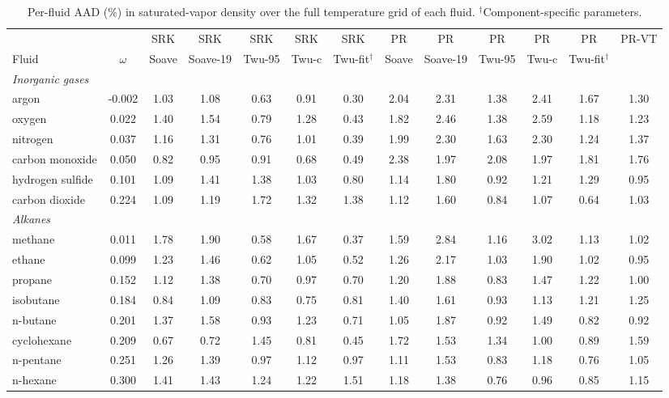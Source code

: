 \begin{table}[H]
\centering
\caption{Per-fluid AAD (\%) in saturated-vapor density over the full temperature grid of each fluid. $^{\dagger}$Component-specific parameters.}
\label{tab:tabS_perfluid_rhov}
\small
\begin{tabular}{lcccccccccccc}
\toprule
 &  & SRK & SRK & SRK & SRK & SRK & PR & PR & PR & PR & PR & PR-VT \\
Fluid & $\omega$ & Soave & Soave-19 & Twu-95 & Twu-c & Twu-fit$^{\dagger}$ & Soave & Soave-19 & Twu-95 & Twu-c & Twu-fit$^{\dagger}$ &  \\
\midrule
\multicolumn{15}{l}{\emph{Inorganic gases}} \\
argon & -0.002 & 1.03 & 1.08 & 0.63 & 0.91 & 0.30 & 2.04 & 2.31 & 1.38 & 2.41 & 1.67 & 1.30 \\
oxygen & 0.022 & 1.40 & 1.54 & 0.79 & 1.28 & 0.43 & 1.82 & 2.46 & 1.38 & 2.59 & 1.18 & 1.23 \\
nitrogen & 0.037 & 1.16 & 1.31 & 0.76 & 1.01 & 0.39 & 1.99 & 2.30 & 1.63 & 2.30 & 1.24 & 1.37 \\
carbon monoxide & 0.050 & 0.82 & 0.95 & 0.91 & 0.68 & 0.49 & 2.38 & 1.97 & 2.08 & 1.97 & 1.81 & 1.76 \\
hydrogen sulfide & 0.101 & 1.09 & 1.41 & 1.38 & 1.03 & 0.80 & 1.14 & 1.80 & 0.92 & 1.21 & 1.29 & 0.95 \\
carbon dioxide & 0.224 & 1.09 & 1.19 & 1.72 & 1.32 & 1.38 & 1.12 & 1.60 & 0.84 & 1.07 & 0.64 & 1.03 \\
\multicolumn{15}{l}{\emph{Alkanes}} \\
methane & 0.011 & 1.78 & 1.90 & 0.58 & 1.67 & 0.37 & 1.59 & 2.84 & 1.16 & 3.02 & 1.13 & 1.02 \\
ethane & 0.099 & 1.23 & 1.46 & 0.62 & 1.05 & 0.52 & 1.26 & 2.17 & 1.03 & 1.90 & 1.02 & 0.95 \\
propane & 0.152 & 1.12 & 1.38 & 0.70 & 0.97 & 0.70 & 1.20 & 1.88 & 0.83 & 1.47 & 1.22 & 1.00 \\
isobutane & 0.184 & 0.84 & 1.09 & 0.83 & 0.75 & 0.81 & 1.40 & 1.61 & 0.93 & 1.13 & 1.21 & 1.25 \\
n-butane & 0.201 & 1.37 & 1.58 & 0.93 & 1.23 & 0.71 & 1.05 & 1.87 & 0.92 & 1.49 & 0.82 & 0.92 \\
cyclohexane & 0.209 & 0.67 & 0.72 & 1.45 & 0.81 & 0.45 & 1.72 & 1.53 & 1.34 & 1.00 & 0.89 & 1.59 \\
n-pentane & 0.251 & 1.26 & 1.39 & 0.97 & 1.12 & 0.97 & 1.11 & 1.53 & 0.83 & 1.18 & 0.76 & 1.05 \\
n-hexane & 0.300 & 1.41 & 1.43 & 1.24 & 1.22 & 1.51 & 1.18 & 1.38 & 0.76 & 0.96 & 0.85 & 1.15 \\

\end{tabular}
\end{table}
